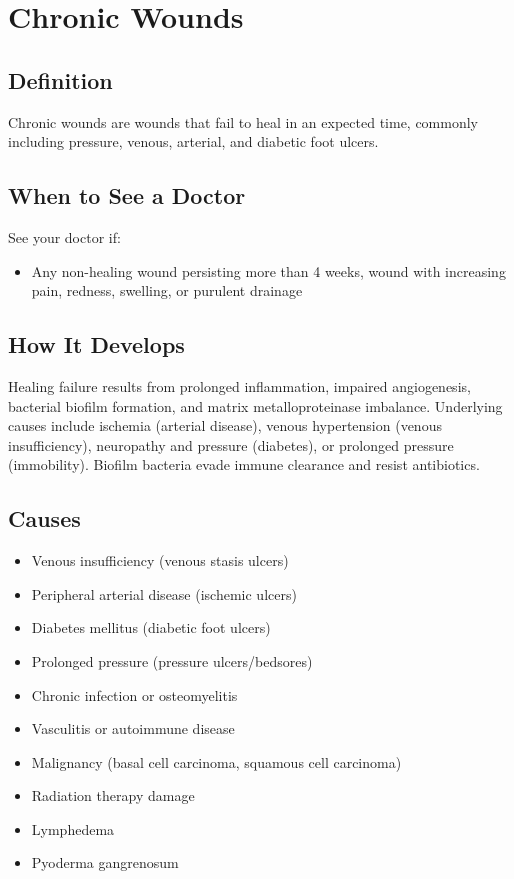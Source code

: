 \chapter{Chronic Wounds}

\section*{Definition}
Chronic wounds are wounds that fail to heal in an expected time, commonly including pressure, venous, arterial, and diabetic foot ulcers.

\section*{When to See a Doctor}
See your doctor if:
\begin{itemize}
  \item Any non-healing wound persisting more than 4 weeks, wound with increasing pain, redness, swelling, or purulent drainage
\end{itemize}

\section*{How It Develops}
Healing failure results from prolonged inflammation, impaired angiogenesis, bacterial biofilm formation, and matrix metalloproteinase imbalance. Underlying causes include ischemia (arterial disease), venous hypertension (venous insufficiency), neuropathy and pressure (diabetes), or prolonged pressure (immobility). Biofilm bacteria evade immune clearance and resist antibiotics.

\section*{Causes}
\begin{itemize}
  \item Venous insufficiency (venous stasis ulcers)
  \item Peripheral arterial disease (ischemic ulcers)
  \item Diabetes mellitus (diabetic foot ulcers)
  \item Prolonged pressure (pressure ulcers/bedsores)
  \item Chronic infection or osteomyelitis
  \item Vasculitis or autoimmune disease
  \item Malignancy (basal cell carcinoma, squamous cell carcinoma)
  \item Radiation therapy damage
  \item Lymphedema
  \item Pyoderma gangrenosum
\end{itemize}

